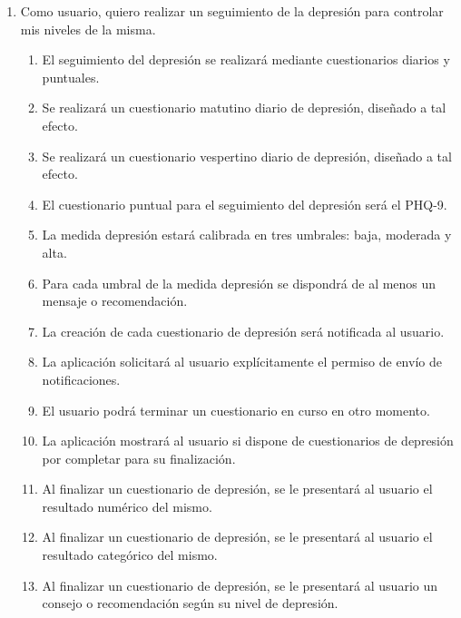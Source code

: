         \begin{enumerate}[resume=req-usuario,label=\textbf{\texttt{RU-\arabic*}}]
            \item Como usuario, quiero realizar un seguimiento de la depresión para controlar mis niveles de la misma.
            \begin{enumerate}[resume=req-funcionales,label=\textbf{\texttt{RF-\arabic*}}]
                \item El seguimiento del depresión se realizará mediante cuestionarios diarios y puntuales.
                \item Se realizará un cuestionario matutino diario de depresión, diseñado a tal efecto.
                \item Se realizará un cuestionario vespertino diario de depresión, diseñado a tal efecto.
                \item El cuestionario puntual para el seguimiento del depresión será el PHQ-9.
                \item La medida depresión estará calibrada en tres umbrales: baja, moderada y alta.
                \item Para cada umbral de la medida depresión se dispondrá de al menos un mensaje o recomendación.
                \item La creación de cada cuestionario de depresión será notificada al usuario.
                \item La aplicación solicitará al usuario explícitamente el permiso de envío de notificaciones.
                \item El usuario podrá terminar un cuestionario en curso en otro momento.
                \item La aplicación mostrará al usuario si dispone de cuestionarios de depresión por completar para su finalización.
                \item Al finalizar un cuestionario de depresión, se le presentará al usuario el resultado numérico del mismo.
                \item Al finalizar un cuestionario de depresión, se le presentará al usuario el resultado categórico del mismo.
                \item Al finalizar un cuestionario de depresión, se le presentará al usuario un consejo o recomendación según su nivel de depresión.
            \end{enumerate}
        \end{enumerate}
